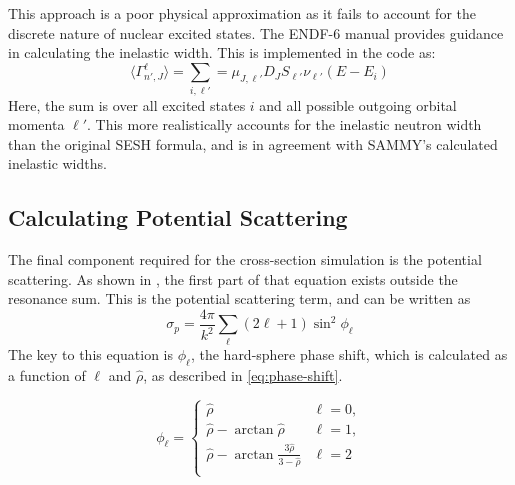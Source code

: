         This approach is a poor physical approximation as it fails to account for the discrete nature of nuclear excited states. The ENDF-6 manual\cite{endf-manual} provides guidance in calculating the inelastic width. This is implemented in the code as:
        \begin{equation}
            \label{eq:inelastic-width}
            \langle \Gamma_{n',J}^\ell \rangle = \sum_{i,\ell'} = \mu_{J,\ell'} D_J S_{\ell'} \nu_{\ell'}(E - E_i)
        \end{equation}
        Here, the sum is over all excited states $i$ and all possible outgoing orbital momenta $\ell'$. This more realistically accounts for the inelastic neutron width than the original SESH formula, and is in agreement with SAMMY's calculated inelastic widths.

    \subsection{Calculating Potential Scattering}
        \label{ssec:pot-scat}

        The final component required for the cross-section simulation is the potential scattering. As shown in \label{eq:slbw}, the first part of that equation exists outside the resonance sum. This is the potential scattering term\cite{t2}, and can be written as
        \begin{equation}
            \label{eq:potential-scattering}
            \sigma_p = \frac{ 4 \pi}{k^2} \sum_\ell (2\ell +1) \sin^2{\phi_\ell}
        \end{equation}
        The key to this equation is $\phi_\ell$, the hard-sphere phase shift, which is calculated as a function of $\ell$ and $\hat{\rho}$, as described in
\autoref{eq:phase-shift}.

    \begin{equation}
        \label{eq:phase-shift}
        \phi_\ell = \begin{cases}
            \hat{\rho} & \ell=0,\\[12pt]
            \hat{\rho} - \arctan{\hat{\rho}} & \ell=1,\\[12pt]
            \displaystyle\hat{\rho} - \arctan{\frac{3\hat{\rho}}{3 - \hat{\rho}} } & \ell=2\\[12pt]
        \end{cases}
    \end{equation}

